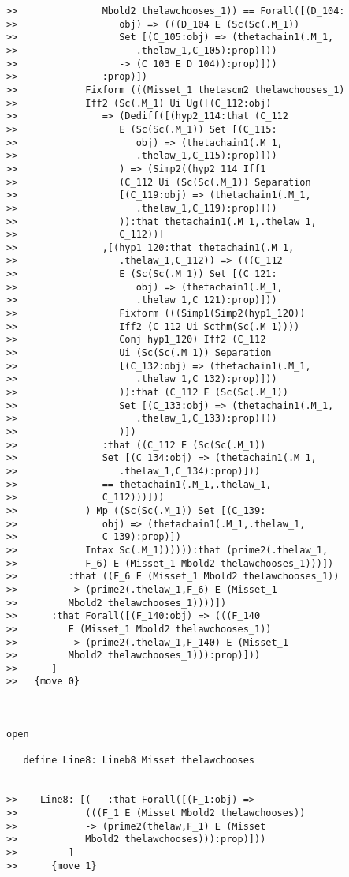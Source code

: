 \documentclass[12pt]{article}
\begin{document}
\begin{verbatim}
>>               Mbold2 thelawchooses_1)) == Forall([(D_104:
>>                  obj) => (((D_104 E (Sc(Sc(.M_1))
>>                  Set [(C_105:obj) => (thetachain1(.M_1,
>>                     .thelaw_1,C_105):prop)]))
>>                  -> (C_103 E D_104)):prop)]))
>>               :prop)])
>>            Fixform (((Misset_1 thetascm2 thelawchooses_1)
>>            Iff2 (Sc(.M_1) Ui Ug([(C_112:obj)
>>               => (Dediff([(hyp2_114:that (C_112
>>                  E (Sc(Sc(.M_1)) Set [(C_115:
>>                     obj) => (thetachain1(.M_1,
>>                     .thelaw_1,C_115):prop)]))
>>                  ) => (Simp2((hyp2_114 Iff1
>>                  (C_112 Ui (Sc(Sc(.M_1)) Separation
>>                  [(C_119:obj) => (thetachain1(.M_1,
>>                     .thelaw_1,C_119):prop)]))
>>                  )):that thetachain1(.M_1,.thelaw_1,
>>                  C_112))]
>>               ,[(hyp1_120:that thetachain1(.M_1,
>>                  .thelaw_1,C_112)) => (((C_112
>>                  E (Sc(Sc(.M_1)) Set [(C_121:
>>                     obj) => (thetachain1(.M_1,
>>                     .thelaw_1,C_121):prop)]))
>>                  Fixform (((Simp1(Simp2(hyp1_120))
>>                  Iff2 (C_112 Ui Scthm(Sc(.M_1))))
>>                  Conj hyp1_120) Iff2 (C_112
>>                  Ui (Sc(Sc(.M_1)) Separation
>>                  [(C_132:obj) => (thetachain1(.M_1,
>>                     .thelaw_1,C_132):prop)]))
>>                  )):that (C_112 E (Sc(Sc(.M_1))
>>                  Set [(C_133:obj) => (thetachain1(.M_1,
>>                     .thelaw_1,C_133):prop)]))
>>                  )])
>>               :that ((C_112 E (Sc(Sc(.M_1))
>>               Set [(C_134:obj) => (thetachain1(.M_1,
>>                  .thelaw_1,C_134):prop)]))
>>               == thetachain1(.M_1,.thelaw_1,
>>               C_112)))]))
>>            ) Mp ((Sc(Sc(.M_1)) Set [(C_139:
>>               obj) => (thetachain1(.M_1,.thelaw_1,
>>               C_139):prop)])
>>            Intax Sc(.M_1)))))):that (prime2(.thelaw_1,
>>            F_6) E (Misset_1 Mbold2 thelawchooses_1)))])
>>         :that ((F_6 E (Misset_1 Mbold2 thelawchooses_1))
>>         -> (prime2(.thelaw_1,F_6) E (Misset_1
>>         Mbold2 thelawchooses_1))))])
>>      :that Forall([(F_140:obj) => (((F_140
>>         E (Misset_1 Mbold2 thelawchooses_1))
>>         -> (prime2(.thelaw_1,F_140) E (Misset_1
>>         Mbold2 thelawchooses_1))):prop)]))
>>      ]
>>   {move 0}



open

   define Line8: Lineb8 Misset thelawchooses


>>    Line8: [(---:that Forall([(F_1:obj) =>
>>            (((F_1 E (Misset Mbold2 thelawchooses))
>>            -> (prime2(thelaw,F_1) E (Misset
>>            Mbold2 thelawchooses))):prop)]))
>>         ]
>>      {move 1}


\end{verbatim}
\end{document}
